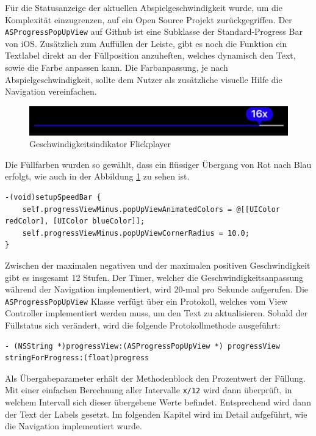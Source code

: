 \documentclass[11pt,a4paper]{report}
\begin{document}
Für die Statusanzeige der aktuellen Abspielgeschwindigkeit wurde, um die Komplexität einzugrenzen, auf ein Open Source Projekt zurückgegriffen. Der \texttt{ASProgressPopUpView} auf Github ist eine Subklasse der Standard-Progress Bar von iOS. Zusätzlich zum Auffüllen der Leiste, gibt es noch die Funktion ein Textlabel direkt an der Füllposition anzuheften, welches dynamisch den Text, sowie die Farbe anpassen kann. Die Farbanpassung, je nach Abspielgeschwindigkeit, sollte dem Nutzer als zusätzliche visuelle Hilfe die Navigation vereinfachen.
\begin{figure}[h]
\begin{center}
\includegraphics[scale=1]{./images/27.png}
\caption{Geschwindigkeitsindikator Flickplayer}
\label{flickplayer_indikator}
\end{center}
\end{figure}
Die Füllfarben wurden so gewählt, dass ein flüssiger Übergang von Rot nach Blau erfolgt, wie auch in der Abbildung \ref{flickplayer_indikator} zu sehen ist.
\begin{lstlisting}
-(void)setupSpeedBar {
	self.progressViewMinus.popUpViewAnimatedColors = @[[UIColor redColor], [UIColor blueColor]];
	self.progressViewMinus.popUpViewCornerRadius = 10.0;
}
\end{lstlisting}
Zwischen der maximalen negativen und der maximalen positiven Geschwindigkeit gibt es insgesamt 12 Stufen. Der Timer, welcher die Geschwindigkeitsanpassung während der Navigation implementiert, wird 20-mal pro Sekunde aufgerufen. Die \texttt{ASProgressPopUpView} Klasse verfügt über ein Protokoll, welches vom View Controller implementiert werden muss, um den Text zu aktualisieren. Sobald der Füllstatus sich verändert, wird die folgende Protokollmethode ausgeführt:
\begin{lstlisting}
- (NSString *)progressView:(ASProgressPopUpView *) progressView stringForProgress:(float)progress 
\end{lstlisting}
Als Übergabeparameter erhält der Methodenblock den Prozentwert der Füllung. Mit einer einfachen Berechnung aller Intervalle \texttt{x/12} wird dann überprüft, in welchem Intervall sich dieser übergebene Werte befindet. Entsprechend wird dann der Text der Labels gesetzt. \cite{ASProgressPopUpViewRepository}
Im folgenden Kapitel wird im Detail aufgeführt, wie die Navigation implementiert wurde.
\end{document}
